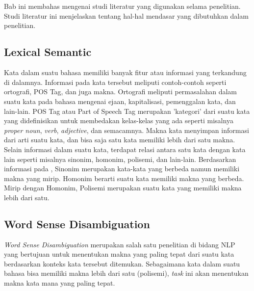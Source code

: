 \chapter{\babDua}
Bab ini membahas mengenai studi literatur yang digunakan selama penelitian. Studi literatur ini menjelaskan tentang hal-hal mendasar yang dibutuhkan dalam penelitian.

\section{Lexical Semantic}

Kata dalam suatu bahasa memiliki banyak fitur atau informasi yang terkandung di dalamnya. Informasi pada kata tersebut meliputi contoh-contoh seperti ortografi, POS Tag, dan juga makna. Ortografi meliputi permasalahan dalam suatu kata pada bahasa mengenai ejaan, kapitalisasi, pemenggalan kata, dan lain-lain. POS Tag atau Part of Speech Tag merupakan 'kategori' dari suatu kata yang didefinisikan untuk membedakan kelas-kelas yang ada seperti misalnya \textit{proper noun}, \textit{verb}, \textit{adjective}, dan semacamnya. Makna kata menyimpan informasi dari arti suatu kata, dan bisa saja satu kata memiliki lebih dari satu makna. Selain informasi dalam suatu kata, terdapat relasi antara satu kata dengan kata lain seperti misalnya sinonim, homonim, polisemi, dan lain-lain. Berdasarkan informasi pada \citep{sheeba2013unsupervised}, Sinonim merupakan kata-kata yang berbeda namun memiliki makna yang mirip. Homonim berarti suatu kata memiliki makna yang berbeda. Mirip dengan Homonim, Polisemi merupakan suatu kata yang memiliki makna lebih dari satu.

\section{Word Sense Disambiguation}
\textit{Word Sense Disambiguation} merupakan salah satu penelitian di bidang NLP yang bertujuan untuk menentukan makna yang paling tepat dari suatu kata berdasarkan konteks kata tersebut ditemukan. Sebagaimana kata dalam suatu bahasa bisa memiliki makna lebih dari satu (polisemi), \textit{task} ini akan menentukan makna kata mana yang paling tepat. 

